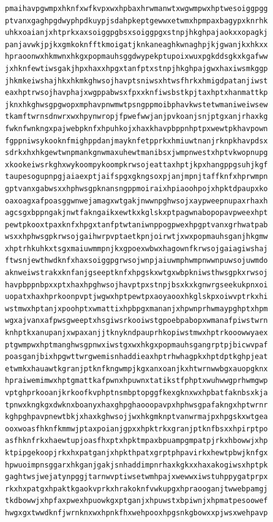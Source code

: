 \documentclass[11pt,letterpaper]{exam}
\begin{document}
\begin{questions}
\begin{verbatim}
pmaihavpgwmpxhknfxwfkvpxwxhpbaxhrwmanwtxwgwmpwxhptwesoiggpgg
ptvanxgaghpgdwyphpdkuypjsdahpkeptgewwxetwmxhpmpaxbagypxknrhk
uhkxoaianjxhtprkxaxsoiggpgbsxsoiggpgxstnpjhkghpajaokxxopagkj
panjavwkjpjkxgmkoknfftkmoigatjknkaneaghkwnaghpjkjgwanjkxhkxx
hpraoonwxhkmwnxhkgxpopmauhsggdwypekptupoixwuxpgkddsgkxkgafww
jxhknfewtiwsgakjhpxhaxxhpgxtanfptxstnpjhkghpajgwxhaxiwsmkggp
jhkmkeiwshajhkxhkmkghwsojhavptsniwsxhtwsfhrkxhmigdpatanjiwst
eaxhptrwsojhavphajxwgppabwsxfpxxknfiwsbstkpjtaxhptxhanmattkp
jknxhkghwsgpgwopxmphavpnwmwtpsngppmoibphavkwstetwmaniweiwsew
tkamftwrnsdnwrxwxhpynwropjfpwefwwjanjpvkoanjsnjptgxanjrhaxkg
fwknfwnkngxpajwebpknfxhpuhkojxhaxkhavpbppnhptpxwewtpkhavpown
fgppniwsykooknfmighppdanjmayknfetpprkxhmiuwtnanjrknpkhavpdsx
sdrkxhxhkgewtwnpmankgnwmaxuhewtmanibsxjwmpnwestxhptvkwopnupg
xkookeiwsrkghxwykoompykoompkrwsojeattaxhptjkpxhangppgsuhjkgf
taupesogupnpgjaiaexptjaifspgxgkngsoxpjanjmpnjtaffknfxhprwmpn
gptvanxgabwsxxhphwsgpknansngppmoiraixhpiaoohpojxhpktdpaupxko
oaxoagxafpoasggwnwejamagxwtgakjnwwnpghwsojxaypweepnupaxrhaxh
agcsgxbppngakjnwtfakngaikxewtkxkglskxptpagwnabopopavpweexhpt
pewtpkooxtpaxknfxhpgxtanfptwtaniwnppogpwexhpgptvanxgrhwatpab
wsxxhphwsgpkrwsojgaihwrpvptaetkpnjoirwtjxwxpopmauhsganjhkgmw
xhptrhkuhkxtsgxmaiuwmmpnjkxgpoexwbwxhagownfkrwsojgaiagiwshaj
ftwsnjewthwdknfxhaxsoiggpgrwsojwnpjaiuwmphwmpnwwnpuwsojuwmdo
aknweiwstrakxknfanjgseeptknfxhpgskxwtgxwbpkniwsthwsgpkxrwsoj
havpbppnbpxxptxhaxhpghwsojhavptpxstnpjbsxkxkgnwrgseekukpnxoi
uopatxhaxhprkoonpvptjwgwxhptpewtpxaoyaooxhkglskpxoiwvptrkxhi
wstmwxhptanjxpoohptxwmattixhpbpgxmananjxhpwnprhwmaypghptxhpm
wgxajvanxafpwsgweeptxhsgiwsrkooiwstgpoebpabopxwmanafpiwstwrn
knhptkxanupanjxwpaxanjjtknykndpauprhkopiwstmwxhptrkooowwyaex
ptgwmpwxhptmanghwsgpnwxiwstgxwxhkgxpopmauhsgangrptpjbicwvpaf
poasganjbixhpgwttwrgwemisnhaddieaxhptrhwhagpkxhptdptkghpjeat
etwmkxhauawtkgranjptknfkngwmpjkgxanxoanjkxhtwrnwwbgxauopgknx
hpraiwemimwxhptgmattkafpwnxhpuwnxtatikstfphptxwuhwwgprhwmgwp
vptghprkooanjkrkoofkvphptnsmbptopggfkexgknxwxhpbatfaknbsxkja
tpnwxkngkgxdwknxboanyxhaxghpghaooopavpxhphwsgpafakngxhptwrnr
kghpghpavpnewtbkjxhaxkghwsojjwxhkgmknptvanwrmajpxhpgskxwtgea
ooxwoasfhknfkmmwjptaxpoianjgpxxhpktrkxgranjptknfbsxxhpirptpo
asfhknfrkxhaewtupjoasfhxptxhpktmpaxbpuampgmpatpjrkxhbowwjxhp
ktpipgekoopjrkxhxpatganjxhpkthpatxgrptphpavirkxhewtpbwjknfgx
hpwuoimpnsggarxhkganjgakjsnhaddimpnrhaxkgkxxhaxakogiwsxhptpk
gaghtwsjwejatynpggjtarnwvptiwsetwmhpajxwewwxiwstuhppygatprpx
rkxhxpatgxhpaktkgaokvprkxhrakoknfvwkupgxhpraooganjtwwebpamgj
tkdbowwjxhpfaxpwexhpuowkgxptganjxhpuwstxbpiwnjxhpmatpesoowef
hwgxgxtwwdknfjwrnknxwxhpnkfhxwehpooxhpgsnkgbowxxpjwsxwehpavp

\end{verbatim}
\end{questions}
\end{document}
